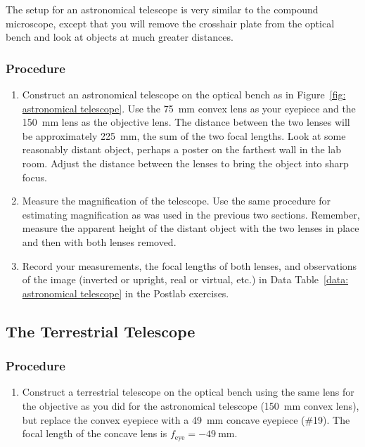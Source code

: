 \documentclass[addpoints]{physlabs}
\begin{document}
\begin{labsection}
    The setup for an astronomical telescope is very similar to the compound microscope, except that you will remove the crosshair plate from the optical bench and look at objects at much greater distances.

    \subsubsection*{Procedure}

    \begin{enumerate}
        \item Construct an astronomical telescope on the optical bench as in Figure~\ref{fig: astronomical telescope}. Use the \qty{75}{\milli\meter} convex lens as your eyepiece and the \qty{150}{\milli\meter} lens as the objective lens. The distance between the two lenses will be approximately \qty{225}{\milli\meter}, the sum of the two focal lengths. Look at some reasonably distant object, perhaps a poster on the farthest wall in the lab room. Adjust the distance between the lenses to bring the object into sharp focus.

        \item Measure the magnification of the telescope. Use the same procedure for estimating magnification as was used in the previous two sections. Remember, measure the apparent height of the distant object with the two lenses in place and then with both lenses removed.
        
        \item Record your measurements, the focal lengths of both lenses, and observations of the image (inverted or upright, real or virtual, etc.) in Data Table~\ref{data: astronomical telescope} in the Postlab exercises.
    \end{enumerate}

    \subsection*{The Terrestrial Telescope}

    \subsubsection*{Procedure}

    \begin{enumerate}
        \item Construct a terrestrial telescope on the optical bench using the same lens for the objective as you did for the astronomical telescope (\qty{150}{\milli\meter} convex lens), but replace the convex eyepiece with a \qty{49}{\milli\meter} concave eyepiece (\#19). The focal length of the concave lens is $f_\text{eye}=-\qty{49}{\milli\meter}$.
        

\end{enumerate}
\end{labsection}
\end{document}
